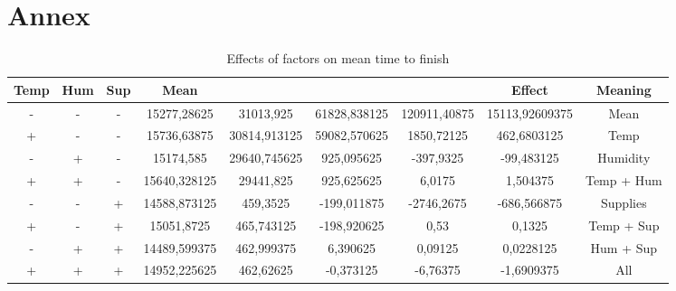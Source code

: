\documentclass[conference]{IEEEtran}
\begin{document}
\newpage
\onecolumn
\section{Annex}

\begin{table}[h]
\caption{Effects of factors on mean time to finish}
\begin{center}
\begin{tabular}{|c|c|c|c|c|c|c|c|c|}
\hline
\textbf{Temp}&\textbf{Hum}&\textbf{Sup}&\textbf{Mean}&&&&\textbf{Effect}&\textbf{Meaning} \\
\hline
-&-&-&15277,28625&31013,925&61828,838125&120911,40875&15113,92609375&Mean \\
+&-&-&15736,63875&30814,913125&59082,570625&1850,72125&462,6803125&Temp \\
-&+&-&15174,585&29640,745625&925,095625&-397,9325&-99,483125&Humidity \\
+&+&-&15640,328125&29441,825&925,625625&6,0175&1,504375&Temp + Hum \\
-&-&+&14588,873125&459,3525&-199,011875&-2746,2675&-686,566875&Supplies \\
+&-&+&15051,8725&465,743125&-198,920625&0,53&0,1325&Temp + Sup \\ 
-&+&+&14489,599375&462,999375&6,390625&0,09125&0,0228125&Hum + Sup \\
+&+&+&14952,225625&462,62625&-0,373125&-6,76375&-1,6909375&All \\
\hline
\end{tabular}
\label{tab:rep_significance_2}
\end{center}
\end{table}
\end{document}
